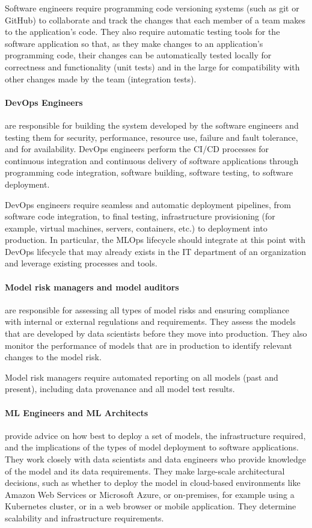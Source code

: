 Software engineers require programming code versioning systems (such as git or GitHub) to collaborate and track the changes that each member of a team makes to the application's code. They also require automatic testing tools for the software application so that, as they make changes to an application's programming code, their changes can be automatically tested locally for correctness and functionality (unit tests) and in the large for compatibility with other changes made by the team (integration tests). 

\paragraph*{DevOps Engineers} are responsible for building the system developed by the software engineers and testing them for security, performance, resource use, failure and fault tolerance, and for availability. DevOps engineers perform the CI/CD processes for continuous integration and continuous delivery of software applications through programming code integration, software building, software testing, to software deployment. 

DevOps engineers require seamless and automatic deployment pipelines, from software code integration, to final testing, infrastructure provisioning (for example, virtual machines, servers, containers, etc.) to deployment into production. In particular, the MLOps lifecycle should integrate at this point with DevOps lifecycle that may already exists in the IT department of an organization and leverage existing processes and tools. 

\paragraph*{Model risk managers and model auditors} are responsible for assessing all types of model risks and ensuring compliance with internal or external regulations and requirements. They assess the models that are developed by data scientists before they move into production. They also monitor the performance of models that are in production to identify relevant changes to the model risk. 

Model risk managers require automated reporting on all models (past and present), including data provenance and all model test results.

\paragraph*{ML Engineers and ML Architects} provide advice on how best to deploy a set of models, the infrastructure required, and the implications of the types of model deployment to software applications. They work closely with data scientists and data engineers who provide knowledge of the model and its data requirements. They make large-scale architectural decisions, such as whether to deploy the model in cloud-based environments like Amazon Web Services or Microsoft Azure, or on-premises, for example using a Kubernetes cluster, or in a web browser or mobile application. They determine scalability and infrastructure requirements.

